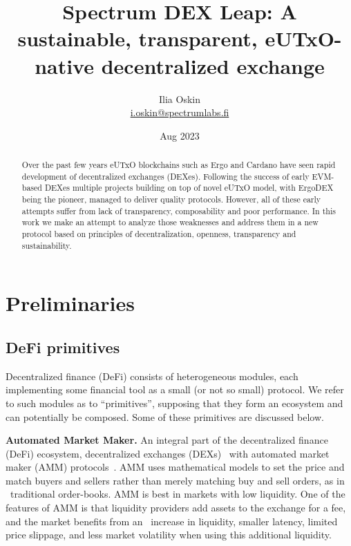 \documentclass[11pt]{article}
\title{Spectrum DEX Leap: A sustainable, transparent, eUTxO-native decentralized exchange}
\author{Ilia Oskin \\ \href{mailto:i.oskin@spectrumlabs.fi}{i.oskin@spectrumlabs.fi}}
\date{Aug 2023}
\begin{document}
    \begin{sloppypar}
        \maketitle


        \begin{abstract}
            Over the past few years eUTxO blockchains such as Ergo and Cardano have seen rapid development of decentralized exchanges (DEXes).
            Following the success of early EVM-based DEXes multiple projects building on top of novel eUTxO model, with ErgoDEX being the pioneer, managed to deliver quality protocols.
            However, all of these early attempts suffer from lack of transparency, composability and poor performance.
            In this work we make an attempt to analyze those weaknesses and address them in a new protocol based on principles of decentralization, openness, transparency and sustainability.
        \end{abstract}


        \section{Preliminaries}\label{sec:preliminaries}

        \subsection{DeFi primitives}\label{subsec:defi-primitives}
        Decentralized finance (DeFi) consists of heterogeneous modules, each implementing some financial tool as a small (or not so small) protocol.
        We refer to such modules as to \enquote{primitives}, supposing that they form an ecosystem and can potentially be composed.
        Some of these primitives are discussed below.

        \textbf{Automated Market Maker.} An integral part of the decentralized finance (DeFi) ecosystem, decentralized exchanges (DEXs) \
        with automated market maker (AMM) protocols~\cite{Xu_2023}.
        AMM uses mathematical models to set the price and match buyers and sellers rather than merely matching buy and sell orders, as in \
        traditional order-books.
        AMM is best in markets with low liquidity.
        One of the features of AMM is that liquidity providers add assets to the exchange for a fee, and the market benefits from an \
        increase in liquidity, smaller latency, limited price slippage, and less market volatility when using this additional liquidity.


\end{sloppypar}
\end{document}

